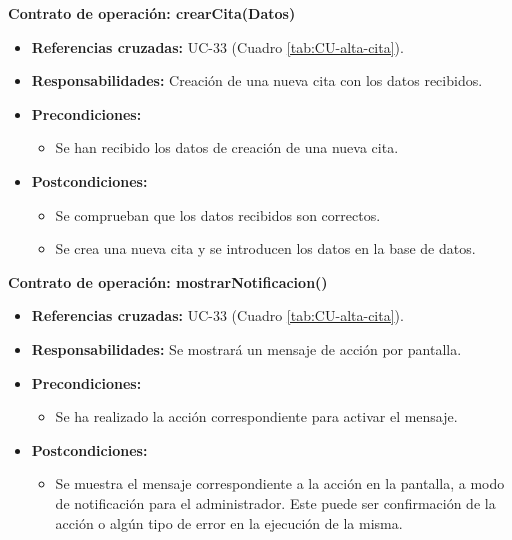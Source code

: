 \textbf{Contrato de operación: crearCita(Datos)}
\begin{itemize}
\item \textbf{Referencias cruzadas:} UC-33 (Cuadro \ref{tab:CU-alta-cita}).
\item \textbf{Responsabilidades:} Creación de una nueva cita con los datos recibidos.
\item \textbf{Precondiciones:} 
 \begin{itemize}
\item Se han recibido los datos de creación de una nueva cita.
\end {itemize}
\item \textbf{Postcondiciones:} 
 \begin{itemize}
 \item Se comprueban que los datos recibidos son correctos.
\item Se crea una nueva cita y se introducen los datos en la base de datos.
\end {itemize}
\end {itemize}

\textbf{Contrato de operación: mostrarNotificacion()}
\begin{itemize}
\item \textbf{Referencias cruzadas:} UC-33 (Cuadro \ref{tab:CU-alta-cita}).
\item \textbf{Responsabilidades:} Se mostrará un mensaje de acción por pantalla.
\item \textbf{Precondiciones:} 
 \begin{itemize}
\item Se ha realizado la acción correspondiente para activar el mensaje.
\end {itemize}
\item \textbf{Postcondiciones:} 
 \begin{itemize}
\item Se muestra el mensaje correspondiente a la acción en la pantalla, a modo de notificación para el administrador. Este puede ser confirmación de la acción o algún tipo de error en la ejecución de la misma.
\end {itemize}
\end {itemize}


\vspace{10mm}

